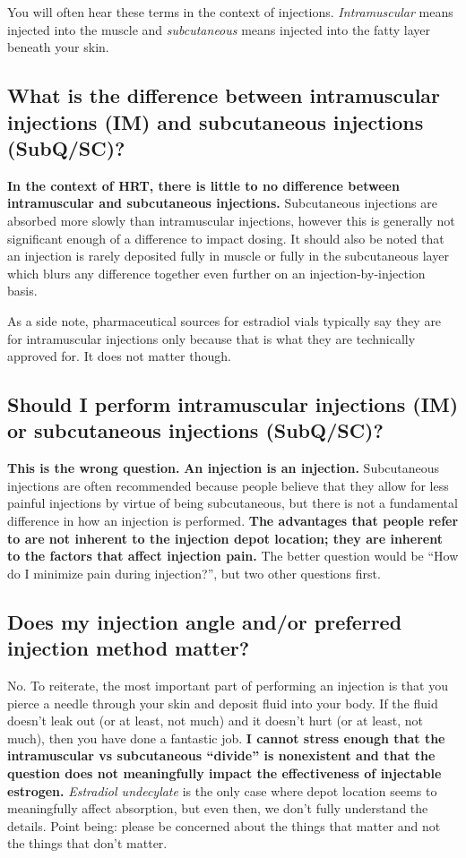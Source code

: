 \documentclass{article}
\begin{document}
{{You will often hear these terms in the context of injections. \textit{Intramuscular} means injected into the muscle and \textit{subcutaneous} means injected into the fatty layer beneath your skin.

\subsection{What is the difference between intramuscular injections (IM) and subcutaneous injections (SubQ/SC)?}

\textbf{In the context of HRT, there is little to no difference between intramuscular and subcutaneous injections.} Subcutaneous injections are absorbed more slowly than intramuscular injections, however this is generally not significant enough of a difference to impact dosing. It should also be noted that an injection is rarely deposited fully in muscle or fully in the subcutaneous layer which blurs any difference together even further on an injection-by-injection basis.

As a side note, pharmaceutical sources for estradiol vials typically say they are for intramuscular injections only because that is what they are technically approved for. It does not matter though.

\subsection{Should I perform intramuscular injections (IM) or subcutaneous injections (SubQ/SC)?}

\textbf{This is the wrong question.} \textbf{An injection is an injection.} Subcutaneous injections are often recommended because people believe that they allow for less painful injections by virtue of being subcutaneous, but there is not a fundamental difference in how an injection is performed. \textbf{The advantages that people refer to are not inherent to the injection depot location; they are inherent to the factors that affect injection pain.} The better question would be “How do I minimize pain during injection?”, but two other questions first.

\subsection{Does my injection angle and/or preferred injection method matter?}

No. To reiterate, the most important part of performing an injection is that you pierce a needle through your skin and deposit fluid into your body. If the fluid doesn’t leak out (or at least, not much) and it doesn’t hurt (or at least, not much), then you have done a fantastic job. \textbf{I cannot stress enough that the intramuscular vs subcutaneous “divide” is nonexistent and that the question does not meaningfully impact the effectiveness of injectable estrogen.} \textit{Estradiol undecylate} is the only case where depot location seems to meaningfully affect absorption, but even then, we don’t fully understand the details. Point being: please be concerned about the things that matter and not the things that don’t matter.

}}
\end{document}
